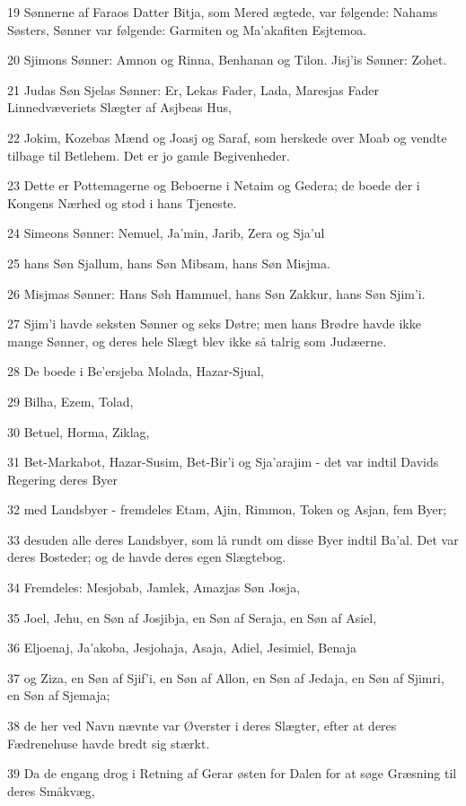 \par 19 Sønnerne af Faraos Datter Bitja, som Mered ægtede, var følgende: Nahams Søsters, Sønner var følgende: Garmiten og Ma'akafiten Esjtemoa.
\par 20 Sjimons Sønner: Amnon og Rinna, Benhanan og Tilon. Jisj'is Sønner: Zohet.
\par 21 Judas Søn Sjelas Sønner: Er, Lekas Fader, Lada, Maresjas Fader Linnedvæveriets Slægter af Asjbeas Hus,
\par 22 Jokim, Kozebas Mænd og Joasj og Saraf, som herskede over Moab og vendte tilbage til Betlehem. Det er jo gamle Begivenheder.
\par 23 Dette er Pottemagerne og Beboerne i Netaim og Gedera; de boede der i Kongens Nærhed og stod i hans Tjeneste.
\par 24 Simeons Sønner: Nemuel, Ja'min, Jarib, Zera og Sja'ul
\par 25 hans Søn Sjallum, hans Søn Mibsam, hans Søn Misjma.
\par 26 Misjmas Sønner: Hans Søh Hammuel, hans Søn Zakkur, hans Søn Sjim'i.
\par 27 Sjim'i havde seksten Sønner og seks Døtre; men hans Brødre havde ikke mange Sønner, og deres hele Slægt blev ikke så talrig som Judæerne.
\par 28 De boede i Be'ersjeba Molada, Hazar-Sjual,
\par 29 Bilha, Ezem, Tolad,
\par 30 Betuel, Horma, Ziklag,
\par 31 Bet-Markabot, Hazar-Susim, Bet-Bir'i og Sja'arajim - det var indtil Davids Regering deres Byer
\par 32 med Landsbyer - fremdeles Etam, Ajin, Rimmon, Token og Asjan, fem Byer;
\par 33 desuden alle deres Landsbyer, som lå rundt om disse Byer indtil Ba'al. Det var deres Bosteder; og de havde deres egen Slægtebog.
\par 34 Fremdeles: Mesjobab, Jamlek, Amazjas Søn Josja,
\par 35 Joel, Jehu, en Søn af Josjibja, en Søn af Seraja, en Søn af Asiel,
\par 36 Eljoenaj, Ja'akoba, Jesjohaja, Asaja, Adiel, Jesimiel, Benaja
\par 37 og Ziza, en Søn af Sjif'i, en Søn af Allon, en Søn af Jedaja, en Søn af Sjimri, en Søn af Sjemaja;
\par 38 de her ved Navn nævnte var Øverster i deres Slægter, efter at deres Fædrenehuse havde bredt sig stærkt.
\par 39 Da de engang drog i Retning af Gerar østen for Dalen for at søge Græsning til deres Småkvæg,
